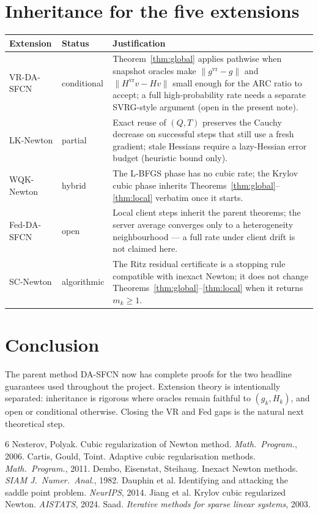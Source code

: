 \documentclass[11pt,a4paper]{article}
\theoremstyle{definition}
\begin{document}
\section{Inheritance for the five extensions}
\begin{center}
\begin{tabular}{@{}llp{7.2cm}@{}}
\toprule
Extension & Status & Justification \\
\midrule
VR-DA-SFCN & conditional & Theorem~\ref{thm:global} applies pathwise when
snapshot oracles make $\|g^{\mathrm{vr}}-g\|$ and
$\|H^{\mathrm{vr}}v-Hv\|$ small enough for the ARC ratio to accept; a full
high-probability rate needs a separate SVRG-style argument (open in the
present note). \\
LK-Newton & partial & Exact reuse of $(Q,T)$ preserves the Cauchy decrease
on successful steps that still use a fresh gradient; stale Hessians require
a lazy-Hessian error budget (heuristic bound only). \\
WQK-Newton & hybrid & The L-BFGS phase has no cubic rate; the Krylov cubic
phase inherits Theorems~\ref{thm:global}--\ref{thm:local} verbatim once it
starts. \\
Fed-DA-SFCN & open & Local client steps inherit the parent theorems; the
server average converges only to a heterogeneity neighbourhood --- a full
rate under client drift is not claimed here. \\
SC-Newton & algorithmic & The Ritz residual certificate is a stopping rule
compatible with inexact Newton; it does not change
Theorems~\ref{thm:global}--\ref{thm:local} when it returns $m_k\ge 1$. \\
\bottomrule
\end{tabular}
\end{center}

\section{Conclusion}
The parent method DA-SFCN now has complete proofs for the two headline
guarantees used throughout the project. Extension theory is intentionally
separated: inheritance is rigorous where oracles remain faithful to
$(g_k,H_k)$, and open or conditional otherwise. Closing the VR and Fed
gaps is the natural next theoretical step.

\begin{thebibliography}{6}
 Nesterov, Polyak. Cubic regularization of Newton
method. \textit{Math.\ Program.}, 2006.
 Cartis, Gould, Toint. Adaptive cubic regularisation
methods. \textit{Math.\ Program.}, 2011.
 Dembo, Eisenstat, Steihaug. Inexact Newton methods.
\textit{SIAM J.\ Numer.\ Anal.}, 1982.
 Dauphin et al. Identifying and attacking the saddle
point problem. \textit{NeurIPS}, 2014.
 Jiang et al. Krylov cubic regularized Newton.
\textit{AISTATS}, 2024.
 Saad. \textit{Iterative methods for sparse linear
systems}, 2003.
\end{thebibliography}
\end{document}
